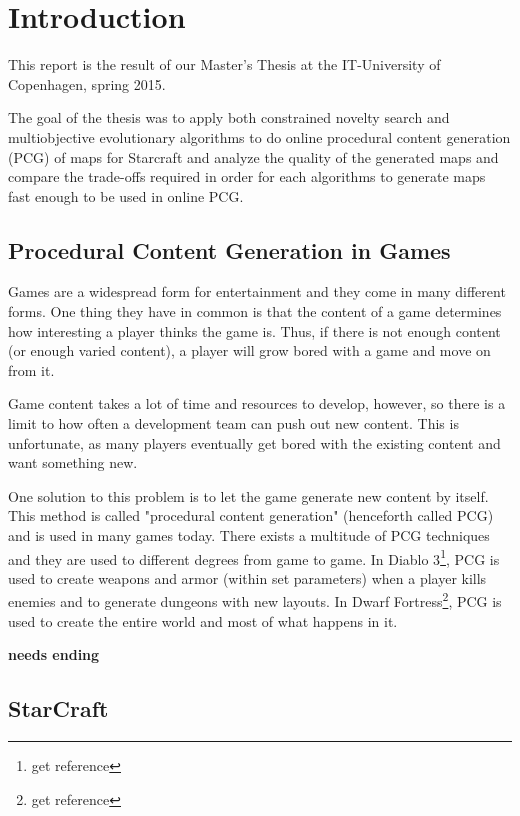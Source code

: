\section{Introduction}
\label{Intro}

This report is the result of our Master's Thesis at the IT-University of Copenhagen, spring 2015.

The goal of the thesis was to apply both constrained novelty search and multiobjective evolutionary algorithms to do online procedural content generation (PCG) of maps for Starcraft and analyze the quality of the generated maps and compare the trade-offs required in order for each algorithms to generate maps fast enough to be used in online\cite{PCGBook} PCG.

\subsection{Procedural Content Generation in Games}
\label{Intro_PCG}

Games are a widespread form for entertainment and they come in many different forms. One thing they have in common is that the content of a game determines how interesting a player thinks the game is. Thus, if there is not enough content (or enough varied content), a player will grow bored with a game and move on from it.

Game content takes a lot of time and resources to develop, however, so there is a limit to how often a development team can push out new content. This is unfortunate, as many players eventually get bored with the existing content and want something new.

One solution to this problem is to let the game generate new content by itself. This method is called "procedural content generation" (henceforth called PCG) and is used in many games today. There exists a multitude of PCG techniques and they are used to different degrees from game to game. In Diablo 3\footnote{get reference}, PCG is used to create weapons and armor (within set parameters) when a player kills enemies and to generate dungeons with new layouts. In Dwarf Fortress\footnote{get reference}, PCG is used to create the entire world and most of what happens in it.

\textbf{needs ending}

\subsection{StarCraft}
\label{Intro_StarCraft}

